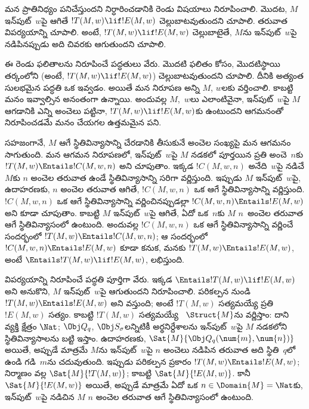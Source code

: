 \documentclass[../../../include/open-logic-section]{subfiles}
\begin{document}

\begin{explain}
మన ప్రాతినిధ్యం పనిచేస్తుందని నిర్ధారించడానికి రెండు విషయాలు నిరూపించాలి.
మొదట, $M$ ఇన్‌పుట్~$w$పై ఆగితే $!T(M, w) \lif !E(M, w)$ చెల్లుబాటవుతుందని
చూపాలి. తరువాత విపర్యయాన్ని చూపాలి. అంటే, $!T(M, w) \lif !E(M, w)$
చెల్లుబాటైతే, $M$ను ఇన్‌పుట్~$w$పై నడిపినప్పుడు అది చివరకు ఆగుతుందని
చూపాలి.

ఈ రెండు ఫలితాలను నిరూపించే పద్ధతులు వేరు. మొదటి ఫలితం కోసం, మొదటిస్థాయి తర్కంలోని
 (అంటే, $!T(M, w) \lif !E(M, w)$) చెల్లుబాటవుతుందని చూపాలి.
దీనికి అత్యంత సులభమైన పద్ధతి ఒక  ఇవ్వడం. అయితే మన నిరూపణ
అన్ని $M$, $w$లకు వర్తించాలి. కాబట్టి మనం 
ఇవ్వాల్సిన  అనంతంగా ఉన్నాయి. అందువల్ల $M$,~$w$లు
ఎలాంటివైనా, ఇన్‌పుట్~$w$పై $M$ ఆగడానికి ఎన్ని అంచెలు పట్టినా,
$!T(M, w) \lif !E(M, w)$కు  ఉంటుందని ఆగమనంతో నిరూపించడమే
మనం చేయగల ఉత్తమమైన పని.

సహజంగానే, $M$ ఆగే స్థితివిన్యాసాన్ని చేరడానికి తీసుకునే అంచెల సంఖ్యపై మన
ఆగమనం సాగుతుంది. మన ఆగమన నిరూపణలో, ఇన్‌పుట్~$w$పై $M$ నడకలో పూర్తయిన ప్రతి
అంచె~$n$కు $!T(M, w) \Entails !C(M, w, n)$ అని చూపుతాం. ఇక్కడ
$!C(M, w, n)$ అనేది~$w$పై నడిచే $M$కు $n$ అంచెల తరువాత ఉండే స్థితివిన్యాసాన్ని
సరిగా వర్ణిస్తుంది. ఇప్పుడు $M$ ఇన్‌పుట్~$w$పై, ఉదాహరణకు, $n$ అంచెల తరువాత
ఆగితే, $!C(M, w, n)$ ఒక ఆగే స్థితివిన్యాసాన్ని వర్ణిస్తుంది. $!C(M, w, n)$
ఒక ఆగే స్థితివిన్యాసాన్ని వర్ణించినప్పుడల్లా
$!C(M, w, n) \Entails !E(M, w)$ అని కూడా చూపుతాం. కాబట్టి $M$ ఇన్‌పుట్~$w$పై
ఆగితే, ఏదో ఒక~$n$కు $M$ $n$~అంచెల తరువాత ఆగే స్థితివిన్యాసంలో ఉంటుంది.
అందువల్ల $!C(M, w, n)$ ఒక ఆగే స్థితివిన్యాసాన్ని వర్ణించే సందర్భంలో
$!T(M, w) \Entails !C(M, w, n)$; ఆ సందర్భంలో
$!C(M, w, n) \Entails !E(M, w)$ కూడా కనుక, మనకు
$!T(M, w) \Entails !E(M, w)$, అంటే
$\Entails !T(M, w) \lif !E(M, w)$, లభిస్తుంది.

విపర్యయాన్ని నిరూపించే పద్ధతి పూర్తిగా వేరు. ఇక్కడ $\Entails !T(M, w) \lif !E(M, w)$
అని అనుకొని, $M$ ఇన్‌పుట్~$w$పై ఆగుతుందని నిరూపించాలి. పరికల్పన నుండి
$!T(M, w) \Entails !E(M, w)$ అని వస్తుంది; అంటే $!T(M,w)$ సత్యమయ్యే ప్రతి
 $!E(M,w)$ సత్యం. కాబట్టి $!T(M,w)$ సత్యమయ్యే
~$\Struct{M}$ను వర్ణిస్తాం: దాని వ్యక్తి క్షేత్రం $\Nat$;
$\Obj Q_q$, $\Obj S_\sigma$లన్నిటికీ అర్థనిర్దేశాలను ఇన్‌పుట్~$w$పై $M$
నడకలోని స్థితివిన్యాసాలను బట్టి ఇస్తాం. ఉదాహరణకు,
$\Sat{M}{\Obj Q_q(\num{m}, \num{n})}$ అయితే, అప్పుడే మాత్రమే $M$ను ఇన్‌పుట్~$w$పై
$n$ అంచెలు నడిపిన తరువాత అది స్థితి~$q$లో ఉండి గడి~$m$ను చదువుతుంది.
ఇప్పుడు పరికల్పన ప్రకారం $!T(M, w) \Entails !E(M, w)$; నిర్మాణం వల్ల
$\Sat{M}{!T(M,w)}$; కాబట్టి $\Sat{M}{!E(M,w)}$. కానీ
$\Sat{M}{!E(M,w)}$ అయితే, అప్పుడే మాత్రమే ఏదో ఒక
$n \in \Domain{M}=\Nat$కు, ఇన్‌పుట్~$w$పై నడిచిన $M$ $n$ అంచెల తరువాత
ఆగే స్థితివిన్యాసంలో ఉంటుంది.
\end{explain}
\end{document}
